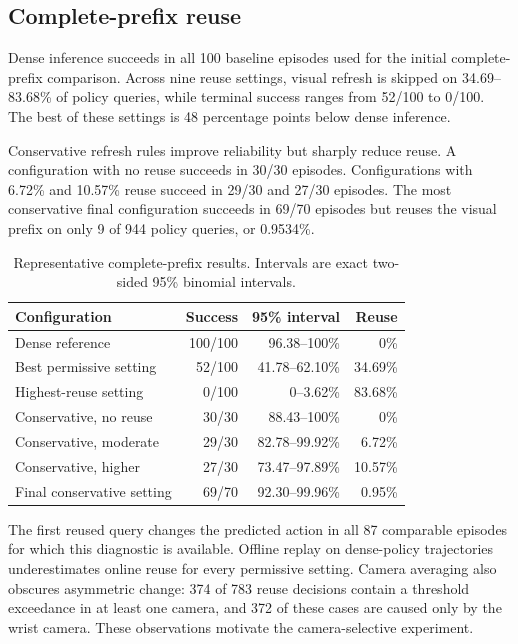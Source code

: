 \documentclass[journal]{IEEEtran}
\begin{document}
\subsection{Complete-prefix reuse}
Dense inference succeeds in all 100 baseline episodes used for the initial complete-prefix comparison. Across nine reuse settings, visual refresh is skipped on 34.69--83.68\% of policy queries, while terminal success ranges from 52/100 to 0/100. The best of these settings is 48 percentage points below dense inference.

Conservative refresh rules improve reliability but sharply reduce reuse. A configuration with no reuse succeeds in 30/30 episodes. Configurations with 6.72\% and 10.57\% reuse succeed in 29/30 and 27/30 episodes. The most conservative final configuration succeeds in 69/70 episodes but reuses the visual prefix on only 9 of 944 policy queries, or 0.9534\%.

\begin{table}[t]
\caption{Representative complete-prefix results. Intervals are exact two-sided 95\% binomial intervals.}
\label{tab:prefix}
\centering
\footnotesize
\begin{tabular}{@{}lrrr@{}}
\toprule
Configuration & Success & 95\% interval & Reuse \\
\midrule
Dense reference & 100/100 & 96.38--100\% & 0\% \\
Best permissive setting & 52/100 & 41.78--62.10\% & 34.69\% \\
Highest-reuse setting & 0/100 & 0--3.62\% & 83.68\% \\
Conservative, no reuse & 30/30 & 88.43--100\% & 0\% \\
Conservative, moderate & 29/30 & 82.78--99.92\% & 6.72\% \\
Conservative, higher & 27/30 & 73.47--97.89\% & 10.57\% \\
Final conservative setting & 69/70 & 92.30--99.96\% & 0.95\% \\
\bottomrule
\end{tabular}
\end{table}

The first reused query changes the predicted action in all 87 comparable episodes for which this diagnostic is available. Offline replay on dense-policy trajectories underestimates online reuse for every permissive setting. Camera averaging also obscures asymmetric change: 374 of 783 reuse decisions contain a threshold exceedance in at least one camera, and 372 of these cases are caused only by the wrist camera. These observations motivate the camera-selective experiment.
\end{document}
